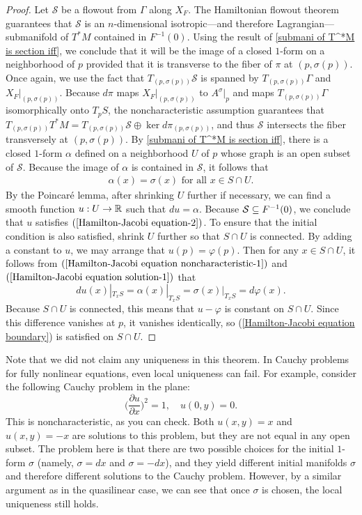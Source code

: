 \begin{proof}
Let $\mathcal{S}$ be a flowout from $\Gamma$ along $X_F$. The Hamiltonian flowout theorem guarantees that $\mathcal{S}$ is an $n$-dimensional isotropic---and therefore Lagrangian---submanifold of $T^*M$ contained in $F^{-1}(0)$. Using the result of \cref{submani of T^*M is section iff}, we conclude that it will be the image of a closed $1$-form on a neighborhood of $p$ provided that it is transverse to the fiber of $\pi$ at $(p,\sigma(p))$. Once again, we use the fact that $T_{(p,\sigma(p))}\mathcal{S}$ is spanned by $T_{(p,\sigma(p))}\Gamma$ and $X_F|_{(p,\sigma(p))}$. Because $d\pi$ maps $X_F|_{(p,\sigma(p))}$ to $A^\sigma|_p$ and maps $T_{(p,\sigma(p))}\Gamma$ isomorphically onto $T_pS$, the noncharacteristic assumption guarantees that $T_{(p,\sigma(p))}T^*M=T_{(p,\sigma(p))}\mathcal{S}\oplus\ker d\pi_{(p,\sigma(p))}$, and thus $\mathcal{S}$ intersects the fiber transversely at $(p,\sigma(p))$. By \cref{submani of T^*M is section iff}, there is a closed $1$-form $\alpha$ defined on a neighborhood $U$ of $p$ whose graph is an open subset of $\mathcal{S}$. Because the image of $\alpha$ is contained in $\mathcal{S}$, it follows that
\begin{align}\label{Hamilton-Jacobi equation solution-1}
\alpha(x)=\sigma(x)\text{ for all }x\in S\cap U.
\end{align}
By the Poincar\'e lemma, after shrinking $U$ further if necessary, we can find a smooth function $u:U\to\mathbb{R}$ such that $du=\alpha$. Because $\mathcal{S}\subseteq F^{-1}(0)$, we conclude that $u$ satisfies $(\ref{Hamilton-Jacobi equation-2})$. To ensure that the initial condition is also satisfied, shrink $U$ further so that $S\cap U$ is connected. By adding a constant to $u$, we may arrange that $u(p)=\varphi(p)$. Then for any $x\in S\cap U$, it follows from $(\ref{Hamilton-Jacobi equation noncharacteristic-1})$ and $(\ref{Hamilton-Jacobi equation solution-1})$ that
\[du(x)|_{T_xS}=\alpha(x)|_{T_xS}=\sigma(x)|_{T_xS}=d\varphi(x).\]
Because $S\cap U$ is connected, this means that $u-\varphi$ is constant on $S\cap U$. Since this difference vanishes at $p$, it vanishes identically, so (\ref{Hamilton-Jacobi equation boundary}) is satisfied on $S\cap U$.
\end{proof}

Note that we did not claim any uniqueness in this theorem. In Cauchy problems for fully nonlinear equations, even local uniqueness can fail. For example, consider the following Cauchy problem in the plane:
\[\Big(\frac{\partial u}{\partial x}\Big)^2=1,\quad u(0,y)=0.\]
This is noncharacteristic, as you can check. Both $u(x,y)=x$ and $u(x,y)=-x$ are solutions to this problem, but they are not equal in any open subset. The problem here is that there are two possible choices for the initial $1$-form $\sigma$ (namely, $\sigma=dx$ and $\sigma=-dx$), and they yield different initial manifolds $\sigma$ and therefore different solutions to the Cauchy problem. However, by a similar argument as in the quasilinear case, we can see that once $\sigma$ is chosen, the local uniqueness still holds.

